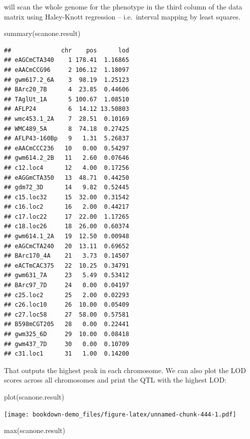 \documentclass[
]{book}
\newenvironment{Shaded}{\begin{snugshade}}{\end{snugshade}}
\newcommand{\FunctionTok}[1]{\textcolor[rgb]{0.00,0.00,0.00}{#1}}
\newcommand{\NormalTok}[1]{#1}
\begin{document}
will scan the whole genome for the phenotype in the third column of the data matrix using Haley-Knott regression -- i.e.~interval mapping by least squares.

\begin{Shaded}
\begin{Highlighting}[]
\FunctionTok{summary}\NormalTok{(scanone.result) }
\end{Highlighting}
\end{Shaded}

\begin{verbatim}
##              chr    pos      lod
## eAGCmCTA340    1 178.41  1.16865
## eAACmCCG96     2 106.12  1.18097
## gwm617.2_6A    3  98.19  1.25123
## BArc20_7B      4  23.85  0.44606
## TAglUt_1A      5 100.67  1.08510
## AFLP24         6  14.12 13.50803
## wmc453.1_2A    7  28.51  0.10169
## WMC489_5A      8  74.18  0.27425
## AFLP43-160Bp   9   1.31  5.26837
## eAACmCCC236   10   0.00  0.54297
## gwm614.2_2B   11   2.60  0.07646
## c12.loc4      12   4.00  0.17256
## eAGGmCTA350   13  48.71  0.44250
## gdm72_3D      14   9.82  0.52445
## c15.loc32     15  32.00  0.31542
## c16.loc2      16   2.00  0.44217
## c17.loc22     17  22.00  1.17265
## c18.loc26     18  26.00  0.60374
## gwm614.1_2A   19  12.50  0.00948
## eAGCmCTA240   20  13.11  0.69652
## BArc170_4A    21   3.73  0.14507
## eACTmCAC375   22  10.25  0.34791
## gwm631_7A     23   5.49  0.53412
## BArc97_7D     24   0.00  0.04197
## c25.loc2      25   2.00  0.02293
## c26.loc10     26  10.00  0.05409
## c27.loc58     27  58.00  0.57581
## B598mCGT205   28   0.00  0.22441
## gwm325_6D     29  10.00  0.08418
## gwm437_7D     30   0.00  0.10709
## c31.loc1      31   1.00  0.14200
\end{verbatim}

That outputs the highest peak in each chromosome. We can also plot the LOD scores across all chromosomes and print the QTL with the highest LOD:

\begin{Shaded}
\begin{Highlighting}[]
\FunctionTok{plot}\NormalTok{(scanone.result) }
\end{Highlighting}
\end{Shaded}

\texttt{[image: bookdown-demo\_files/figure-latex/unnamed-chunk-444-1.pdf]}

\begin{Shaded}
\begin{Highlighting}[]
\FunctionTok{max}\NormalTok{(scanone.result) }
\end{Highlighting}
\end{Shaded}
\end{document}
